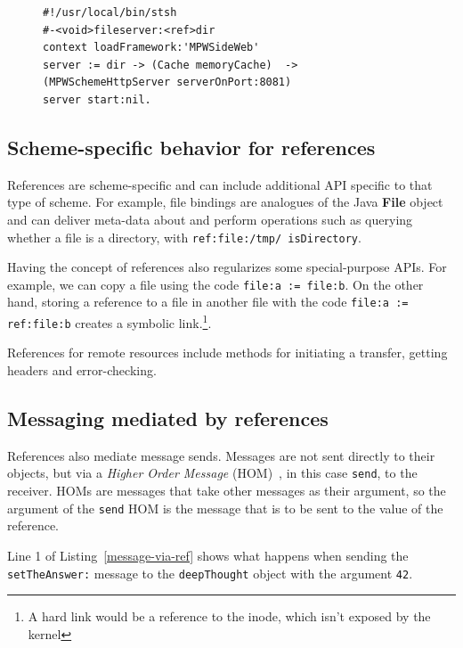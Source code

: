 \documentclass{acm_proc_article-sp}
\begin{document}
\vspace{-1.0em}
\begin{figure}[htbp]
\begin{lstlisting}[style=numbers,label=fileserver,caption=Exporting a directory via http.]
#!/usr/local/bin/stsh
#-<void>fileserver:<ref>dir
context loadFramework:'MPWSideWeb'
server := dir -> (Cache memoryCache)  ->  (MPWSchemeHttpServer serverOnPort:8081)
server start:nil.
\end{lstlisting}
\end{figure}

\vspace{-2.0em}


\subsection{Scheme-specific behavior for references}

References are scheme-specific and can include additional API specific to that type of scheme.
For example, file bindings are analogues of the Java {\bf File} object and can deliver
meta-data about and perform operations such as querying whether a file is a directory, with
{\tt ref:file:/tmp/ isDirectory}.


Having the concept of references also regularizes some special-purpose APIs.  For example,
we can copy a file using the code {\tt file:a := file:b}.  On the other hand, storing a reference 
to a file in another file with the code {\tt file:a := ref:file:b} creates a symbolic link.\footnote{A hard link
would be a reference to the inode, which isn't exposed by the kernel}.

References for remote resources include methods for initiating a transfer, getting headers and 
error-checking.

\subsection{Messaging mediated by references}

References also mediate message sends.   Messages are not sent directly to their objects, but via a
\emph{Higher Order Message} (HOM)~\cite{HOM}, in this case {\tt send}, to the receiver.    HOMs
are messages that take other messages as their argument, so the argument of the {\tt send} HOM is the
message that is to be sent to the value of the reference.  

  Line 1 of Listing~\ref{message-via-ref} shows
what happens when sending the {\tt setTheAnswer:} message to the {\tt deepThought} object with
the argument {\tt 42}.
\end{document}
